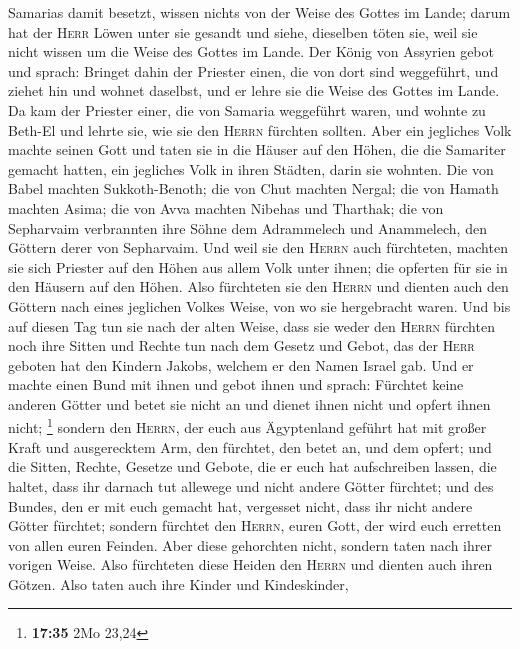 Samarias damit besetzt, wissen nichts von der Weise des Gottes im Lande;
darum hat der \textsc{Herr} Löwen unter sie gesandt und siehe, dieselben
töten sie, weil sie nicht wissen um die Weise des Gottes im Lande.
 Der König von Assyrien gebot und sprach: Bringet dahin
der Priester einen, die von dort sind weggeführt, und ziehet hin und
wohnet daselbst, und er lehre sie die Weise des Gottes im Lande.
 Da kam der Priester einer, die von Samaria weggeführt
waren, und wohnte zu Beth-El und lehrte sie, wie sie den \textsc{Herrn}
fürchten sollten.  Aber ein jegliches Volk machte seinen
Gott und taten sie in die Häuser auf den Höhen, die die Samariter
gemacht hatten, ein jegliches Volk in ihren Städten, darin sie wohnten.
 Die von Babel machten Sukkoth-Benoth; die von Chut
machten Nergal; die von Hamath machten Asima;  die von
Avva machten Nibehas und Tharthak; die von Sepharvaim verbrannten ihre
Söhne dem Adrammelech und Anammelech, den Göttern derer von Sepharvaim.
 Und weil sie den \textsc{Herrn} auch fürchteten, machten
sie sich Priester auf den Höhen aus allem Volk unter ihnen; die opferten
für sie in den Häusern auf den Höhen.  Also fürchteten
sie den \textsc{Herrn} und dienten auch den Göttern nach eines jeglichen
Volkes Weise, von wo sie hergebracht waren.  Und bis auf
diesen Tag tun sie nach der alten Weise, dass sie weder den
\textsc{Herrn} fürchten noch ihre Sitten und Rechte tun nach dem Gesetz
und Gebot, das der \textsc{Herr} geboten hat den Kindern Jakobs, welchem
er den Namen Israel gab.  Und er machte einen Bund mit
ihnen und gebot ihnen und sprach: Fürchtet keine anderen Götter und
betet sie nicht an und dienet ihnen nicht und opfert ihnen nicht;
\footnote{\textbf{17:35} 2Mo 23,24}  sondern den
\textsc{Herrn}, der euch aus Ägyptenland geführt hat mit großer Kraft
und ausgerecktem Arm, den fürchtet, den betet an, und dem opfert;
 und die Sitten, Rechte, Gesetze und Gebote, die er euch
hat aufschreiben lassen, die haltet, dass ihr darnach tut allewege und
nicht andere Götter fürchtet;  und des Bundes, den er mit
euch gemacht hat, vergesset nicht, dass ihr nicht andere Götter
fürchtet;  sondern fürchtet den \textsc{Herrn}, euren
Gott, der wird euch erretten von allen euren Feinden. 
Aber diese gehorchten nicht, sondern taten nach ihrer vorigen Weise.
 Also fürchteten diese Heiden den \textsc{Herrn} und
dienten auch ihren Götzen. Also taten auch ihre Kinder und Kindeskinder,

